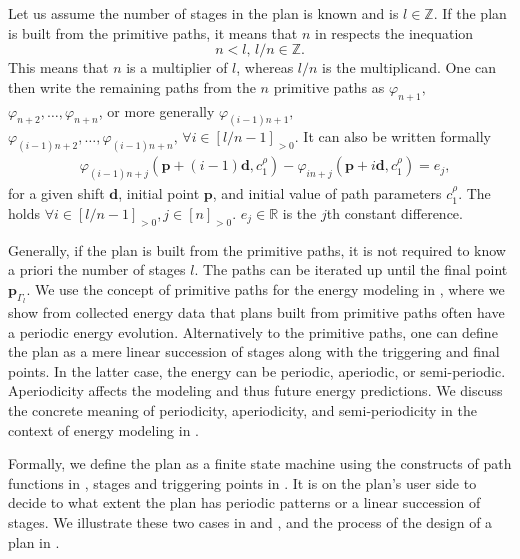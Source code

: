 Let us assume the number of stages in the plan is known and is $l\in\mathbb{Z}$. If the plan is built from the primitive paths, it means that $n$ in  respects the inequation
\begin{equation}
  n<l,\,l/n\in\mathbb{Z}.
\end{equation}
This means that $n$ is a multiplier of $l$, whereas $l/n$ is the multiplicand. One can then write the remaining paths from the $n$ primitive paths as $\varphi_{n+1},$ $\varphi_{n+2},\dots,\varphi_{n+n}$, or more generally $\varphi_{(i-1)n+1},$ $\varphi_{(i-1)n+2},\dots,\varphi_{(i-1)n+n},\,\forall i\in[l/n-1]_{>0}$. It can also be written formally
\begin{equation}\label{eq:primitive}\begin{split}
  &\varphi_{(i-1)n+j}(\mathbf{p}+(i-1)\mathbf{d},c_1^\rho)-\varphi_{in+j}(\mathbf{p}+i\mathbf{d},c_1^\rho)=e_j,
\end{split}\end{equation}
for a given shift $\mathbf{d}$, initial point $\mathbf{p}$, and initial value of path parameters $c_1^\rho$. The  holds $\forall i\in[l/n-1]_{>0},j\in[n]_{>0}$. $e_j\in\mathbb{R}$ is the $j$th constant difference.

Generally, if the plan is built from the primitive paths, it is not required to know a priori the number of stages $l$. The paths can be iterated up until the final point $\mathbf{p}_{\Gamma_l}$. We use the concept of primitive paths for the energy modeling in , where we show from collected energy data that plans built from primitive paths often have a periodic energy evolution. Alternatively to the primitive paths, one can define the plan as a mere linear succession of stages along with the triggering and final points. In the latter case, the energy can be periodic, aperiodic, or semi-periodic. Aperiodicity affects the modeling and thus future energy predictions. We discuss the concrete meaning of periodicity, aperiodicity, and semi-periodicity in the context of energy modeling in .

Formally, we define the plan as a finite state machine using the constructs of path functions in , stages and triggering points in . It is on the plan's user side to decide to what extent the plan has periodic patterns or a linear succession of stages. We illustrate these two cases in  and , and the process of the design of a plan in . 

